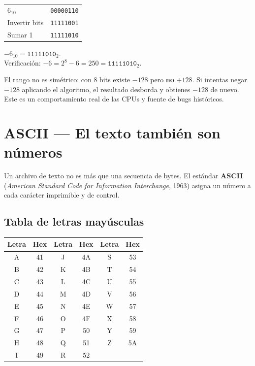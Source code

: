 \documentclass[12pt, oneside]{article}
\begin{document}
\begin{ejemplo}
\begin{center}
\begin{tabular}{ll}
  $6_{10}$              & \texttt{00000110} \\
  Invertir bits         & \texttt{11111001} \\
  Sumar 1               & \texttt{11111010} \\
\end{tabular}
\end{center}
$-6_{10} = \texttt{11111010}_2$. \\[4pt]
Verificación: $-6 = 2^8 - 6 = 250 = \texttt{11111010}_2$. \checkmark
\end{ejemplo}

\begin{advertencia}
  El rango no es simétrico: con 8 bits existe $-128$ pero \textbf{no}
  $+128$. Si intentas negar $-128$ aplicando el algoritmo, el resultado
  desborda y obtienes $-128$ de nuevo. Este es un comportamiento real
  de las CPUs y fuente de bugs históricos.
\end{advertencia}

\section{ASCII — El texto también son números}

Un archivo de texto no es más que una secuencia de bytes.
El estándar \textbf{ASCII} (\textit{American Standard Code for Information
Interchange}, 1963) asigna un número a cada carácter imprimible y de control.

\subsection{Tabla de letras mayúsculas}

\begin{center}
\begin{tabular}{cc|cc|cc}
  \toprule
  \textbf{Letra} & \textbf{Hex} &
  \textbf{Letra} & \textbf{Hex} &
  \textbf{Letra} & \textbf{Hex} \\
  \midrule
  A & 41 & J & 4A & S & 53 \\
  B & 42 & K & 4B & T & 54 \\
  C & 43 & L & 4C & U & 55 \\
  D & 44 & M & 4D & V & 56 \\
  E & 45 & N & 4E & W & 57 \\
  F & 46 & O & 4F & X & 58 \\
  G & 47 & P & 50 & Y & 59 \\
  H & 48 & Q & 51 & Z & 5A \\
  I & 49 & R & 52 &   &    \\
  \bottomrule
\end{tabular}
\end{center}
\end{document}
